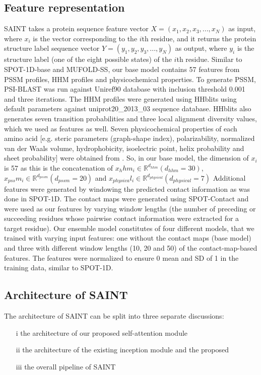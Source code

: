 \documentclass[11 pt, a4paper]{article}
\begin{document}
\begin{multicols}{2}
\subsection{ Feature representation}
SAINT takes a protein sequence feature vector $X =
(x_1, x_2, x_3, ... ,x_N) $ as input, where $x_i$ is the 
vector corresponding to the $i$th residue, and it returns the
protein structure label sequence vector $Y = (y_1, y_2, y_3,
... , y_N)$ as output, where $y_i$ is the structure label
(one of the eight possible states) of the $i$th residue.
Similar to SPOT-1D-base and MUFOLD-SS, our base model
contains 57 features from PSSM profiles, HHM profiles and 
physicochemical properties. To generate PSSM, PSI-BLAST 
\cite{Altschul} was run against Uniref90 database 
\cite{UniProtConsortium} with inclusion threshold 0.001 and 
three iterations. The HHM profiles were generated using 
HHblits \cite{Remmert} using default parameters against
uniprot20\_2013\_03 sequence database. HHblits also generates
seven transition probabilities and three local alignment 
diversity values, which we used as features as well. Seven
physicochemical properties of each amino acid [e.g. steric 
parameters (graph-shape index), polarizability, normalized 
van der Waals volume, hydrophobicity, isoelectric point,
helix probability and sheet probability] were obtained from
\cite{Meiler}. So, in our base model, the dimension of $x_i$
is 57 as this is the concatenation of
$ x_hhm_i \in \mathbb{R}^{d_{hhm}} (d_{hhm}=30)$,
$x_{pss}m_i \in \mathbb{R}^{d_{pssm}} (d_{pssm}=20)$ and 
$x_{physica}l_i \in \mathbb{R}^{d_{physical}}
(d_{physical}=7)$
Additional features were generated by windowing the predicted 
contact information as was done in SPOT-1D. The contact maps 
were generated using SPOT-Contact \cite{Hanson} and were used
as our features by varying window lengths (the number of
preceding or succeeding residues whose pairwise contact
information were extracted for a target residue).
Our ensemble model constitutes of four different models, that
we trained with varying input features: one without the 
contact maps (base model) and three with different window 
lengths (10, 20 and 50) of the contact-map-based features. 
The features were normalized to ensure 0 mean and SD of 1 in 
the training data, similar to SPOT-1D.

\subsection{Architecture of SAINT}
The architecture of SAINT can be split into three separate
discussions: 
\begin{enumerate}
    \item[i] the architecture of our proposed self-attention
    module
    \item[ii] the architecture of the existing inception
    module and the proposed
    \item[iii] the overall pipeline of SAINT
\end{enumerate}


\end{multicols}
\end{document}
